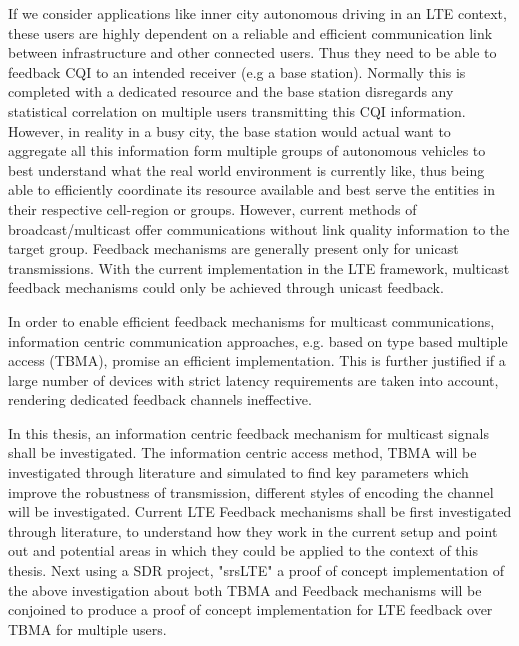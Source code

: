 \documentclass{article}
\begin{document}
If we consider applications like inner city autonomous driving in an LTE context, these users are highly dependent on a reliable and efficient communication link between infrastructure and other connected users. Thus they need to be able to feedback \ac{CQI} to an intended receiver (e.g a base station). Normally this is completed with a dedicated resource and the base station disregards any statistical correlation on multiple users transmitting this \ac{CQI} information. However, in reality in a busy city, the base station would actual want to aggregate all this information form multiple groups of autonomous vehicles to best understand what the real world environment is currently like, thus being able to efficiently coordinate its resource available and best serve the entities in their respective cell-region or groups. However, current methods of broadcast/multicast offer communications without link quality information to the target group. Feedback mechanisms are generally present only for unicast transmissions. With the current implementation in the LTE framework, multicast feedback mechanisms could only be achieved through unicast feedback.

In order to enable efficient feedback mechanisms for multicast communications, information centric communication approaches, e.g. based on type based multiple access (TBMA)\cite{tbma}, promise an efficient implementation. This is further justified if a large number of devices with strict latency requirements are taken into account, rendering dedicated feedback channels ineffective. 

In this thesis, an information centric feedback mechanism for multicast signals shall be investigated. The information centric access method, \ac{TBMA}  will be investigated through literature and simulated to find key parameters which improve the robustness of transmission, different styles of encoding the channel will be investigated. 
Current LTE Feedback mechanisms shall be first investigated through literature, to understand how they work in the current setup and point out and potential areas in which they could be applied to the context of this thesis. Next using a SDR project, "srsLTE" a proof of concept implementation of the above investigation about both \ac{TBMA} and Feedback mechanisms will be conjoined to produce a proof of concept implementation for LTE feedback over TBMA for multiple users. 
\end{document}
